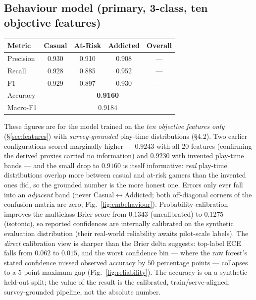 \documentclass[11pt,a4paper]{article}
\begin{document}
\subsection{Behaviour model (primary, 3-class, ten objective features)}
\label{sec:behresults}
\begin{center}
\begin{tabular}{lcccc}
\toprule
\textbf{Metric} & \textbf{Casual} & \textbf{At-Risk} & \textbf{Addicted} & \textbf{Overall} \\
\midrule
Precision & 0.930 & 0.910 & 0.908 & --- \\
Recall    & 0.928 & 0.885 & 0.952 & --- \\
F1        & 0.929 & 0.897 & 0.930 & --- \\
\midrule
Accuracy  & \multicolumn{4}{c}{\textbf{0.9160}} \\
Macro-F1  & \multicolumn{4}{c}{0.9184} \\
\bottomrule
\end{tabular}
\end{center}
These figures are for the model trained on the \emph{ten objective features only}
(\S\ref{sec:features}) with \emph{survey-grounded} play-time distributions
(\S4.2). Two earlier configurations scored marginally higher --- $0.9243$ with all 20
features (confirming the derived proxies carried no information) and $0.9230$ with
invented play-time bands --- and the small drop to $0.9160$ is itself informative:
\emph{real} play-time distributions overlap more between casual and at-risk gamers
than the invented ones did, so the grounded number is the more honest one. Errors
only ever fall into an \emph{adjacent} band (never Casual$\leftrightarrow$Addicted;
both off-diagonal corners of the confusion matrix are zero;
Fig.~\ref{fig:cmbehaviour}). Probability calibration
improves the multiclass Brier score from $0.1343$ (uncalibrated) to $0.1275$
(isotonic), so reported confidences are internally calibrated on the synthetic
evaluation distribution (their real-world reliability awaits pilot-scale labels).
The \emph{direct} calibration view is sharper than the Brier delta suggests:
top-label ECE falls from $0.062$ to $\mathbf{0.015}$, and the worst confidence
bin --- where the raw forest's stated confidence missed observed accuracy by
$50$ percentage points --- collapses to a $5$-point maximum gap
(Fig.~\ref{fig:reliability}). The accuracy is on a synthetic
held-out split; the value of the result is the calibrated, train/serve-aligned,
survey-grounded pipeline, not the absolute number.
\end{document}

